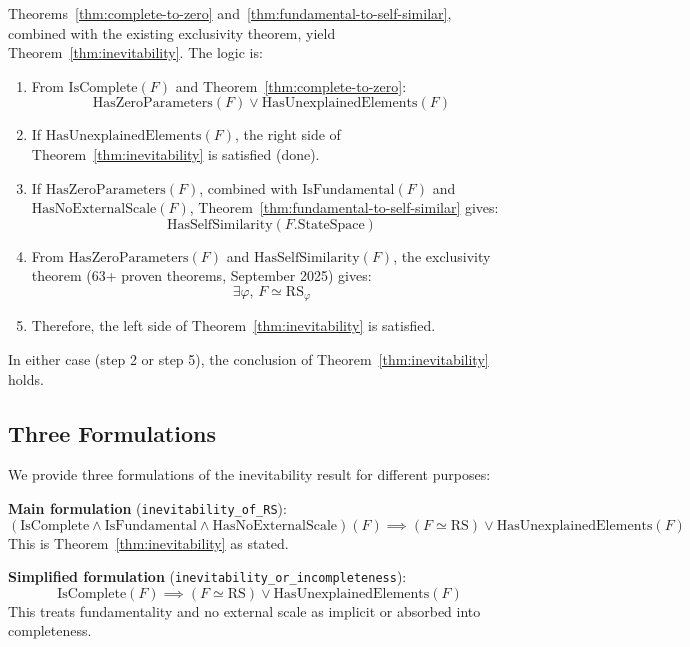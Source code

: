 \documentclass[12pt]{article}
\theoremstyle{remark}
\begin{document}
Theorems~\ref{thm:complete-to-zero} and~\ref{thm:fundamental-to-self-similar}, combined with the existing exclusivity theorem, yield Theorem~\ref{thm:inevitability}. The logic is:

\begin{enumerate}
\item From $\mathrm{IsComplete}(F)$ and Theorem~\ref{thm:complete-to-zero}:
\[
\mathrm{HasZeroParameters}(F) \lor \mathrm{HasUnexplainedElements}(F)
\]

\item If $\mathrm{HasUnexplainedElements}(F)$, the right side of Theorem~\ref{thm:inevitability} is satisfied (done).

\item If $\mathrm{HasZeroParameters}(F)$, combined with $\mathrm{IsFundamental}(F)$ and $\mathrm{HasNoExternalScale}(F)$, Theorem~\ref{thm:fundamental-to-self-similar} gives:
\[
\mathrm{HasSelfSimilarity}(F.\mathrm{StateSpace})
\]

\item From $\mathrm{HasZeroParameters}(F)$ and $\mathrm{HasSelfSimilarity}(F)$, the exclusivity theorem (63+ proven theorems, September 2025) gives:
\[
\exists \varphi,\, F \simeq \mathrm{RS}_\varphi
\]

\item Therefore, the left side of Theorem~\ref{thm:inevitability} is satisfied.
\end{enumerate}

In either case (step 2 or step 5), the conclusion of Theorem~\ref{thm:inevitability} holds.

\subsection{Three Formulations}

We provide three formulations of the inevitability result for different purposes:

\textbf{Main formulation} (\texttt{inevitability\_of\_RS}):
\[
(\mathrm{IsComplete} \land \mathrm{IsFundamental} \land \mathrm{HasNoExternalScale})(F) \implies (F \simeq \mathrm{RS}) \lor \mathrm{HasUnexplainedElements}(F)
\]
This is Theorem~\ref{thm:inevitability} as stated.

\textbf{Simplified formulation} (\texttt{inevitability\_or\_incompleteness}):
\[
\mathrm{IsComplete}(F) \implies (F \simeq \mathrm{RS}) \lor \mathrm{HasUnexplainedElements}(F)
\]
This treats fundamentality and no external scale as implicit or absorbed into completeness.
\end{document}
